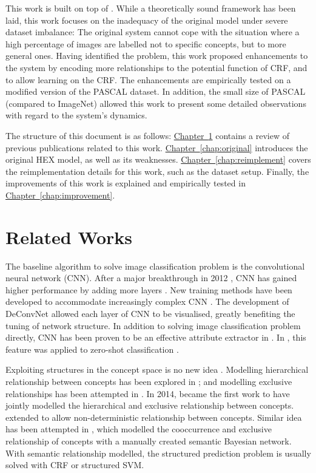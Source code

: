 \documentclass[11pt,a4paper]{book}
\begin{document}
This work is built on top of \cite{deng2014large}. While a theoretically sound framework has been laid, this work focuses on the inadequacy of the original model under severe dataset imbalance: The original system cannot cope with the situation where a high percentage of images are labelled not to specific concepts, but to more general ones. Having identified the problem, this work proposed enhancements to the system by encoding more relationships to the potential function of CRF, and to allow learning on the CRF. The enhancements are empirically tested on a modified version of the PASCAL dataset. In addition, the small size of PASCAL (compared to ImageNet) allowed this work to present some detailed observations with regard to the system's dynamics.

The structure of this document is as follows: \hyperref[chap:related]{Chapter~\ref{chap:related}} contains a review of previous publications related to this work. \hyperref[chap:original]{Chapter~\ref{chap:original}} introduces the original HEX model, as well as its weaknesses. \hyperref[chap:reimplement]{Chapter~\ref{chap:reimplement}} covers the reimplementation details for this work, such as the dataset setup. Finally, the improvements of this work is explained and empirically tested in \hyperref[chap:improvement]{Chapter~\ref{chap:improvement}}.

\chapter{Related Works}
\label{chap:related}

The baseline algorithm to solve image classification problem is the convolutional neural network (CNN). After a major breakthrough in 2012 \cite{krizhevsky2012imagenet}, CNN has gained higher performance by adding more layers \cite{szegedy2014going}. New training methods have been developed to accommodate increasingly complex CNN \cite{simonyan2014very}. The development of DeConvNet \cite{zeiler2014visualizing} allowed each layer of CNN to be visualised, greatly benefiting the tuning of network structure. In addition to solving image classification problem directly, CNN has been proven to be an effective attribute extractor in \cite{razavian2014cnn}. In \cite{deng2014large, ding2015probabilistic}, this feature was applied to zero-shot classification \cite{elhoseiny2013write}.

Exploiting structures in the concept space is no new idea \cite{tousch2012semantic}. Modelling hierarchical relationship between concepts has been explored in \cite{marszalek2007semantic, ordonez2013large}; and modelling exclusive relationships has been attempted in \cite{chen2011multi}. In 2014, \cite{deng2014large} became the first work to have jointly modelled the hierarchical and exclusive relationship between concepts. \cite{ding2015probabilistic} extended \cite{deng2014large} to allow non-deterministic relationship between concepts. Similar idea has been attempted in \cite{xie2010probabilistic}, which modelled the cooccurrence and exclusive relationship of concepts with a manually created semantic Bayesian network. With semantic relationship modelled, the structured prediction problem is usually solved with CRF \cite{lafferty2001conditional} or structured SVM.
\end{document}
